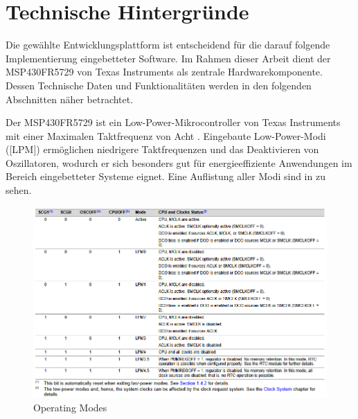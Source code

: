 
\chapter{Technische Hintergr\"unde}
\label{sec:UeberblickEntwicklungsplattform}

Die gew\"ahlte Entwicklungsplattform ist entscheidend f\"ur die darauf folgende Implementierung eingebetteter Software. Im Rahmen dieser Arbeit dient der MSP430FR5729 von Texas Instruments als zentrale Hardwarekomponente. Dessen Technische Daten und Funktionalit\"aten werden in den folgenden Abschnitten n\"aher betrachtet.

Der MSP430FR5729 ist ein Low-Power-Mikrocontroller   von Texas Instruments mit einer Maximalen Taktfrequenz von Acht . Eingebaute Low-Power-Modi ([LPM]) erm\"oglichen \ua niedrigere Taktfrequenzen und das Deaktivieren von Oszillatoren, wodurch er sich besonders gut f\"ur energieeffiziente Anwendungen im Bereich eingebetteter Systeme eignet. Eine Auflistung aller Modi sind in  zu sehen. \\

\begin{figure}[h!]
	\centering
	\includegraphics[width=1.0\textwidth]{../Bilder/Operating_Modes.png}
	\caption{Operating Modes }
	\label{fig:operation_modes}
\end{figure}

